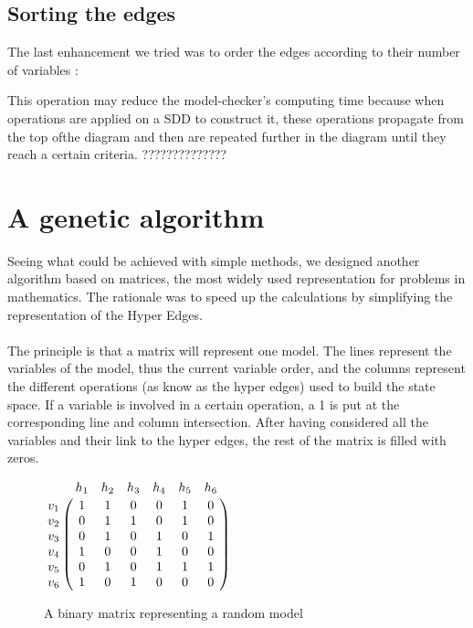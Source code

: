 \documentclass[12pt]{report}
\begin{document}
\section{Sorting the edges}

The last enhancement we tried was to order the edges according to their number of variables :

\begin{algorithm}
\begin{algorithmic}[1]
\EndFunction
\end{algorithmic}
\end{algorithm}

This operation may reduce the model-checker's computing time because when operations are applied on a SDD to construct it, these operations propagate from the top ofthe diagram and then are repeated further in the diagram until they reach a certain criteria. ??????????????

\chapter{A genetic algorithm}

Seeing what could be achieved with simple methods, we designed another algorithm based on matrices, the most widely used representation for problems in mathematics. The rationale was to speed up the calculations by simplifying the representation of the Hyper Edges.
\\\\
The principle is that a matrix will represent one model. The lines represent the variables of the model, thus the current variable order, and the columns represent the different operations (as know as the hyper edges) used to build the state space. If a variable is involved in a certain operation, a 1 is put at the corresponding line and column intersection. After having considered all the variables and their link to the hyper edges, the rest of the matrix is filled with zeros.

\begin{figure}[!h]
  \centering
  $\bordermatrix{
  ~ & h_1 & h_2 & h_3 & h_4 & h_5 & h_6 \cr
  v_1 & 1 & 1 & 0 & 0 & 1 & 0 \cr
  v_2 & 0 & 1 & 1 & 0 & 1 & 0 \cr
  v_3 & 0 & 1 & 0 & 1 & 0 & 1 \cr
  v_4 & 1 & 0 & 0 & 1 & 0 & 0 \cr
  v_5 & 0 & 1 & 0 & 1 & 1 & 1 \cr
  v_6 & 1 & 0 & 1 & 0 & 0 & 0\cr
  }$
  \caption{A binary matrix representing a random model}
  \label{example_matrix}
\end{figure}
\end{document}
